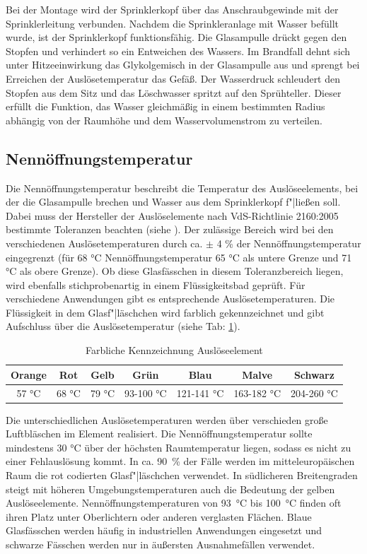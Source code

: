 Bei der Montage wird der Sprinklerkopf über das Anschraubgewinde mit der Sprinklerleitung verbunden. Nachdem die Sprinkleranlage mit Wasser befüllt wurde, ist der Sprinklerkopf funktionsfähig. Die Glasampulle drückt gegen den Stopfen und verhindert so ein Entweichen des Wassers. Im Brandfall dehnt sich unter Hitzeeinwirkung das Glykolgemisch in der Glasampulle aus und sprengt bei Erreichen der Auslösetemperatur das Gefäß. Der Wasserdruck schleudert den Stopfen aus dem Sitz und das Löschwasser spritzt auf den Sprühteller. Dieser erfüllt die Funktion, das Wasser gleichmäßig in einem bestimmten Radius abhängig von der Raumhöhe und dem Wasservolumenstrom zu verteilen. 


\subsection{Nennöffnungstemperatur}
\label{Ausloesetemperatur}
Die Nennöffnungstemperatur beschreibt die Temperatur des Auslöseelements, bei der die Glasampulle brechen und Wasser aus dem Sprinklerkopf f"|ließen soll. Dabei muss der Hersteller der Auslöselemente nach VdS-Richtlinie 2160:2005 bestimmte Toleranzen beachten (siehe \cite[S. 8]{VDS2160}). Der zulässige Bereich wird bei den verschiedenen Auslösetemperaturen durch ca. $\pm$ 4 \% der Nenn\-öff\-nungs\-temp\-er\-at\-ur eingegrenzt (\zB für 68 °C Nenn\-öff\-nungs\-temp\-er\-at\-ur 65 °C als untere Grenze und 71 °C als obere Grenze). Ob diese Glasfässchen in diesem Toleranzbereich liegen, wird ebenfalls stichprobenartig in einem Flüssigkeitsbad geprüft.
Für verschiedene Anwendungen gibt es entsprechende Auslösetemperaturen. Die Flüssigkeit in dem Glasf"|läschchen wird farblich gekennzeichnet und gibt Aufschluss über die Auslösetemperatur (siehe Tab: \ref{tab:Kennzeichnung}). 
\begin{table}\centering
\caption{Farbliche Kennzeichnung Auslöseelement \cite{VDS4001}}
\label{tab:Kennzeichnung}
\begin{tabular}[width=\textwidth]{@{}ccccccc@{}} \toprule
Orange&Rot&Gelb&Grün&Blau&Malve&Schwarz    \\ \midrule
57 °C&68 °C&79 °C&93-100 °C&121-141 °C&163-182 °C&204-260 °C  \\
\bottomrule
\end{tabular}
\end{table}
Die unterschiedlichen Auslösetemperaturen werden über verschieden große Luftbläschen im Element realisiert. Die Nenn\-öff\-nungs\-temp\-er\-at\-ur sollte mindestens 30 °C über der höchsten Raumtemperatur liegen, sodass es nicht zu einer Fehlauslösung kommt. In ca. 90~\% der Fälle werden im mitteleuropäischen Raum die rot codierten Glasf"|läschchen verwendet. In südlicheren Breitengraden steigt mit höheren Umgebungstemperaturen auch die Bedeutung der gelben Auslöseelemente. Nenn\-öff\-nungs\-temp\-er\-at\-ur\-en von 93~°C bis 100~°C finden oft ihren Platz unter Oberlichtern oder anderen verglasten Flächen. Blaue Glasfässchen werden häufig in industriellen Anwendungen eingesetzt und schwarze Fässchen werden nur in äußersten Ausnahmefällen verwendet.

